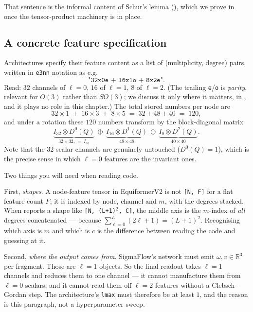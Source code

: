 \documentclass[11pt,a4paper]{report}
\theoremstyle{definition}
\theoremstyle{remark}
\newcommand{\RR}{\mathbb R}
\newcommand{\shape}[1]{\texttt{[#1]}}
\begin{document}
That sentence is the informal content of Schur's lemma
(), which we prove in
 once the tensor-product machinery is in place.

\subsection{A concrete feature specification}

Architectures specify their feature content as a list of
(multiplicity, degree) pairs, written in \texttt{e3nn} notation as e.g.
\[
\texttt{"32x0e + 16x1o + 8x2e"} .
\]
Read: $32$ channels of $\ell=0$, $16$ of $\ell=1$, $8$ of $\ell=2$. (The
trailing \texttt{e}/\texttt{o} is \emph{parity}, relevant for $O(3)$ rather
than $SO(3)$; we discuss it only where it matters, in
, and it plays no role in this chapter.) The total
stored numbers per node are
\[
32\times1 \;+\; 16\times3 \;+\; 8\times5 \;=\; 32+48+40 \;=\; 120 ,
\]
and under a rotation these $120$ numbers transform by the block-diagonal
matrix
\[
\underbrace{I_{32}\otimes D^0(Q)}_{32\times32,\ =\,I_{32}}
\ \oplus\
\underbrace{I_{16}\otimes D^1(Q)}_{48\times48}
\ \oplus\
\underbrace{I_{8}\otimes D^2(Q)}_{40\times40} .
\]
Note that the $32$ scalar channels are genuinely untouched ($D^0(Q)=1$),
which is the precise sense in which $\ell=0$ features are the invariant
ones.

\begin{tcolorbox}[colback=blue!3,colframe=blue!40!black,title=Why this matters for SigmaFlow]
Two things you will need when reading code.

First, \emph{shapes}. A node-feature tensor in EquiformerV2 is not
\shape{N, F} for a flat feature count $F$; it is indexed by node, channel
and $m$, with the degrees stacked. When \Cref{chap:equiformer} reports a
shape like \texttt{[N, (L+1)}$^2$\texttt{, C]}, the middle axis is the
$m$-index of \emph{all} degrees concatenated --- because
$\sum_{\ell=0}^{L}(2\ell+1)=(L+1)^2$. Recognising which axis is $m$ and
which is $c$ is the difference between reading the code and guessing at it.

Second, \emph{where the output comes from}. SigmaFlow's network must emit
$\omega,v\in\RR^3$ per fragment. Those are $\ell=1$ objects. So the final
readout takes $\ell=1$ channels and reduces them to one channel --- it
cannot manufacture them from $\ell=0$ scalars, and it cannot read them off
$\ell=2$ features without a Clebsch--Gordan step. The architecture's
\texttt{lmax} must therefore be at least $1$, and the reason is this
paragraph, not a hyperparameter sweep.
\end{tcolorbox}
\end{document}
